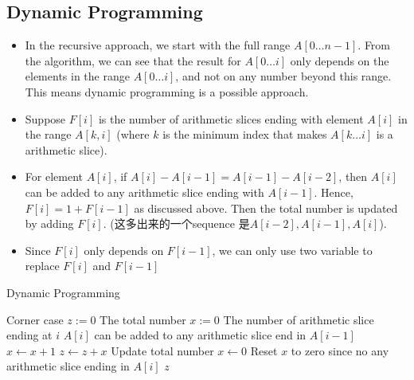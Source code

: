 \subsection{Dynamic Programming}
\begin{itemize}
\item In the recursive approach, we start with the full range $A[0\ldots n-1]$. From the algorithm, we can see that the result for $A[0\ldots i]$ only depends on the elements in the range $A[0\ldots i]$, and not on any number beyond this range. This means dynamic programming is a possible approach.
\item Suppose $F[i]$ is the number of arithmetic slices ending with element $A[i]$ in the range $A[k, i]$ (where $k$ is the minimum index that makes $A[k\ldots i]$ is a arithmetic slice).
\item For element $A[i]$, if $A[i] - A[i-1] = A[i-1] - A[i-2]$, then $A[i]$ can be added to any arithmetic slice ending with $A[i-1]$. Hence, $F[i] = 1 + F[i-1]$ as discussed above. Then the total number is updated by adding $F[i]$. (这多出来的一个sequence 是$A[i-2], A[i-1], A[i]$).
\item Since $F[i]$ only depends on $F[i-1]$, we can only use two variable to replace $F[i]$ and $F[i-1]$
\end{itemize}

\begin{algorithm}[H]
\caption{Dynamic Programming}
\begin{algorithmic}[1]
 \Comment Corner case
\State {}
\EndIf
\State $z:=0$ \Comment The total number
\State $x:=0$ \Comment The number of arithmetic slice ending at $i$
\State $A[i]$ can be added to any arithmetic slice end in $A[i-1]$
\State $x\gets x+1$
\State $z\gets z+x$ \Comment Update total number
\Else
\State $x\gets 0$ \Comment Reset $x$ to zero since no any arithmetic slice ending in $A[i]$
\EndIf
\EndFor
\State \Return $ z $
\EndProcedure
\end{algorithmic}
\end{algorithm}
